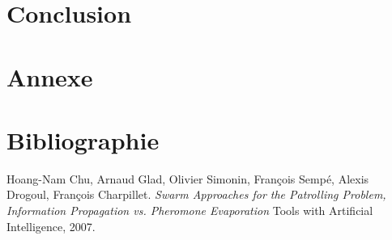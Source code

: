 \documentclass{article}
\begin{document}
\section{Conclusion}

\appendix
\section{Annexe}
\listoffigures
\section*{Bibliographie}
\begin{thebibliography}{1}
    Hoang-Nam Chu, Arnaud Glad, Olivier Simonin, François Sempé, Alexis Drogoul, François Charpillet.
    \textit{Swarm Approaches for the Patrolling Problem, Information Propagation vs. Pheromone Evaporation}
    Tools with Artificial Intelligence, 2007.
\end{thebibliography}
\end{document}
